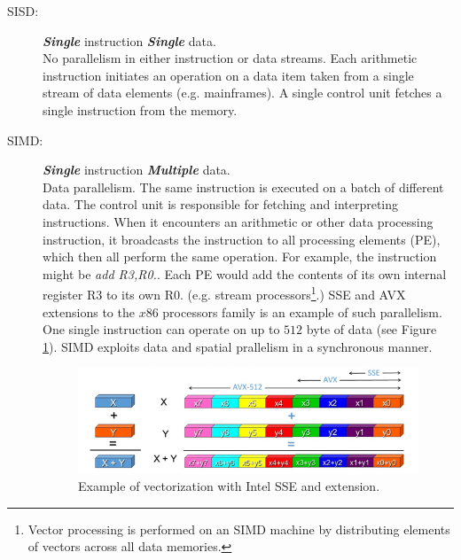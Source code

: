 \begin{description}
\item[SISD:] \textit{\textbf{Single}} instruction \textit{\textbf{Single}}
data.\hfill\\
No parallelism in either instruction or data streams. Each arithmetic
instruction initiates an operation on a data item taken from a single stream of data elements (e.g. mainframes). A single control unit fetches a single instruction from the memory.
\item[SIMD:] \textit{\textbf{Single}} instruction
\textit{\textbf{Multiple}} data. \hfill \\ Data parallelism. The same
instruction is executed on a batch of different data. The control unit is
responsible for fetching and interpreting instructions. When it encounters an
arithmetic or other data processing instruction, it broadcasts the instruction
to all processing elements (PE), which then all perform the same operation. For
example, the instruction might be \textit{add R3,R0.}. Each PE would add the
contents of its own internal register R3 to its own R0. (e.g. stream
processors\footnote{Vector processing is performed on an SIMD machine by distributing
elements of vectors across all data memories.}.) SSE and AVX extensions to the $x86$ processors family is an example of such parallelism. One single instruction can operate on up to $512$ byte of data (see Figure \ref{fig:SSEvectorization}). SIMD exploits data and spatial prallelism in a synchronous manner.

\begin{figure}
	\centering
	\includegraphics[scale=0.6]{./images/parallel_programming/vectorization_example}
	\caption{Example of vectorization with Intel SSE and extension.}
	\label{fig:SSEvectorization}
\end{figure}


\end{description}
